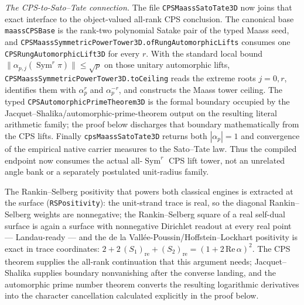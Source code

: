 \documentclass[11pt]{article}
\theoremstyle{definition}
\newcommand{\Sym}{\operatorname{Sym}}
\begin{document}
\smallskip
\noindent\emph{The CPS-to-Sato--Tate connection.}  The file
\texttt{CPSMaassSatoTate3D} now joins that exact interface to the object-valued
all-rank CPS conclusion.  The canonical base \texttt{maassCPSBase} is the
rank-two polynomial Satake pair of the typed Maass seed, and
\texttt{CPSMaassSymmetricPowerTower3D.ofRungAutomorphicLifts} consumes one
\texttt{CPSRungAutomorphicLift3D} for every $r$.  With the standard local bound
$\lVert\alpha_{p,j}(\Sym^r\pi)\rVert\le\sqrt p$ on those unitary automorphic
lifts, \texttt{CPSMaassSymmetricPowerTower3D.toCeiling} reads the extreme roots
$j=0,r$, identifies them with $\alpha_p^r$ and $\alpha_p^{-r}$, and constructs
the Maass tower ceiling.  The typed \texttt{CPSAutomorphicPrimeTheorem3D} is the formal boundary
occupied by the Jacquet--Shalika/automorphic-prime-theorem output on the resulting literal
arithmetic family; the proof below discharges that boundary mathematically from the CPS lifts.
Finally \texttt{cpsMaassSatoTate3D} returns both $|\alpha_p|=1$ and
convergence of the empirical native carrier measures to the Sato--Tate law.
Thus the compiled endpoint now consumes the actual all-$\Sym^r$ CPS lift tower,
not an unrelated angle bank or a separately postulated unit-radius family.

\smallskip
\noindent The Rankin--Selberg positivity that powers both classical engines is
extracted at the surface (\texttt{RSPositivity}): the
unit-strand trace is real, so the diagonal Rankin--Selberg weights are
nonnegative; the Rankin--Selberg square of a real self-dual surface is again a
surface with nonnegative Dirichlet readout at every real point --- Landau-ready
--- and the de la Vall\'ee-Poussin/Hoffstein--Lockhart positivity is exact in
trace coordinates: $2+2\,(S_1)_{\mathrm{re}}+(S_2)_{\mathrm{re}}
=(1+2\,\mathrm{Re}\,\alpha)^2$.  The CPS theorem supplies the all-rank continuation
that this argument needs; Jacquet--Shalika supplies boundary nonvanishing after
the converse landing, and the automorphic prime number theorem converts the
resulting logarithmic derivatives into the character cancellation calculated
explicitly in the proof below.
\end{document}
